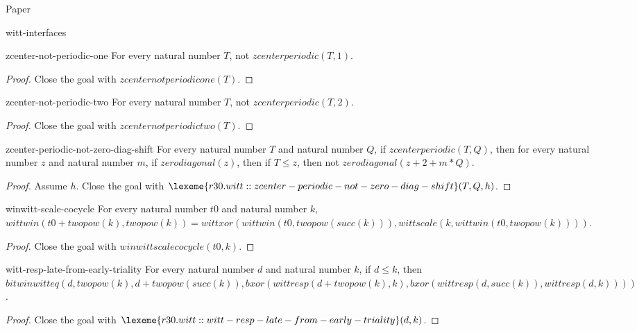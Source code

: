 \begin{lexlean}{Paper}
\begin{section}{witt-interfaces}
  \begin{theorem}{zcenter-not-periodic-one}
  For every natural number \(T\), not \(zcenterperiodic(T, 1)\).
  \begin{proof}
  Close the goal with \(zcenternotperiodicone(T)\).
  \end{proof}
  \end{theorem}

  \begin{theorem}{zcenter-not-periodic-two}
  For every natural number \(T\), not \(zcenterperiodic(T, 2)\).
  \begin{proof}
  Close the goal with \(zcenternotperiodictwo(T)\).
  \end{proof}
  \end{theorem}

  \begin{theorem}{zcenter-periodic-not-zero-diag-shift}
  For every natural number \(T\) and natural number \(Q\), if \(zcenterperiodic(T, Q)\), then for every natural number \(z\) and natural number \(m\), if \(zerodiagonal(z)\), then if \(T ≤ z\), then not \(zerodiagonal(z + 2 + m * Q)\).
  \begin{proof}
  Assume \(h\).
  Close the goal with \(\lexeme{r30.witt::zcenter-periodic-not-zero-diag-shift}(T, Q, h)\).
  \end{proof}
  \end{theorem}

  \begin{theorem}{winwitt-scale-cocycle}
  For every natural number \(t0\) and natural number \(k\), \(wittwin(t0 + twopow(k), twopow(k)) = wittxor(wittwin(t0, twopow(succ(k))), wittscale(k, wittwin(t0, twopow(k))))\).
  \begin{proof}
  Close the goal with \(winwittscalecocycle(t0, k)\).
  \end{proof}
  \end{theorem}

  \begin{theorem}{witt-resp-late-from-early-triality}
  For every natural number \(d\) and natural number \(k\), if \(d ≤ k\), then \(bitwinwitteq(d, twopow(k), d + twopow(succ(k)), bxor(wittresp(d + twopow(k), k), bxor(wittresp(d, succ(k)), wittresp(d, k))))\).
  \begin{proof}
  Close the goal with \(\lexeme{r30.witt::witt-resp-late-from-early-triality}(d, k)\).
  \end{proof}
  \end{theorem}


\end{section}
\end{lexlean}
